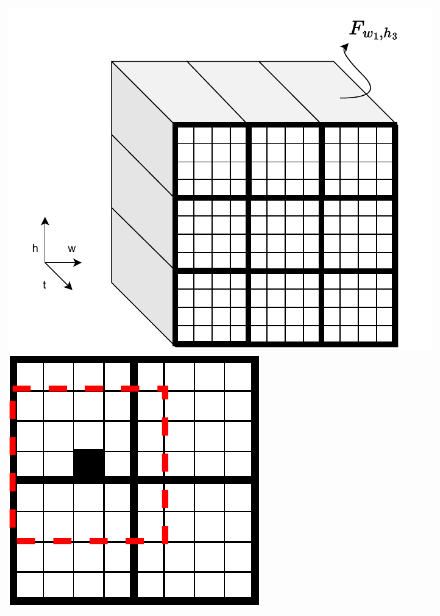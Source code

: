 \documentclass{article}
\begin{document}
\begin{figure}[h]

    \centering
    \hspace{-20mm}
    \begin{subcaptionblock}{.4\textwidth}
        \centering
        \includegraphics[width=\textwidth]{images/quantile_mapping.drawio.pdf}
        \caption{}\label{}
    \end{subcaptionblock}%
    \hspace{30mm}
    \begin{subcaptionblock}{0.20\textwidth}
        \centering
        \includegraphics[width=\textwidth]{images/quantile_conv.drawio.pdf}
        \caption{}\label{}
    \end{subcaptionblock}%
    

\end{figure}
\end{document}
